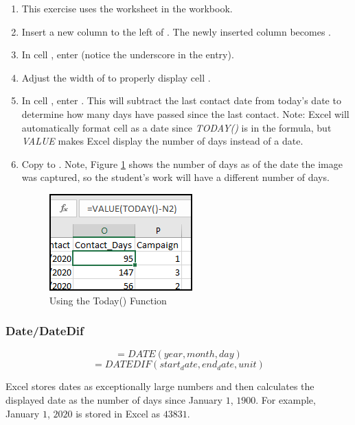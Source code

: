 \begin{enumerate}
	\item This exercise uses the  worksheet in the  workbook.
	\item Insert a new column to the left of . The newly inserted column becomes .
	\item In cell , enter  (notice the underscore in the entry).
	\item Adjust the width of  to properly display cell .
	\item In cell , enter . This will subtract the last contact date from today's date to determine how many days have passed since the last contact. Note: Excel will automatically format cell  as a date since \textit{TODAY()} is in the formula, but \textit{VALUE} makes Excel display the number of days instead of a date.
	\item Copy  to . Note, Figure \ref{09:fig45} shows the number of days as of the date the image was captured, so the student's work will have a different number of days.
	
	\begin{figure}[H]
		\centering
		\includegraphics[width=\maxwidth{.50\linewidth}]{gfx/ch09_fig45}
		\caption{Using the Today() Function}
		\label{09:fig45}
	\end{figure}
	
\end{enumerate}

\subsubsection{Date/DateDif}

\[ =DATE(year, month, day) \]
\[ =DATEDIF (start_date, end_date, unit) \]

Excel stores dates as exceptionally large numbers and then calculates the displayed date as the number of days since January $ 1 $, $ 1900 $. For example, January $ 1 $, $ 2020 $ is stored in Excel as $ 43831 $. 

